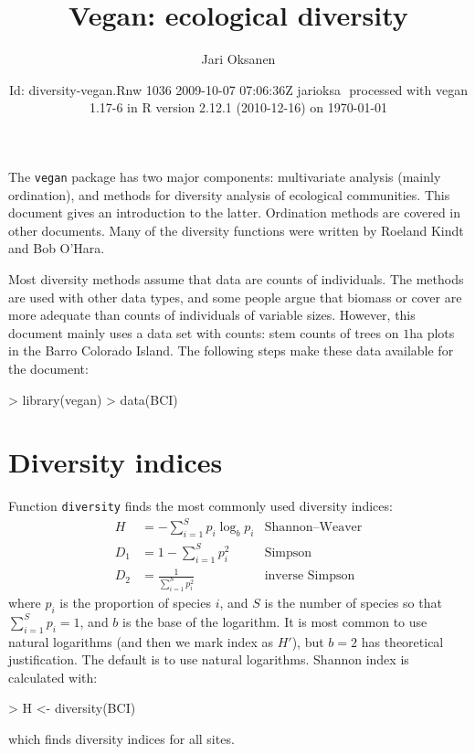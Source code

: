 \documentclass[a4paper,10pt]{amsart}
\title{Vegan: ecological diversity}
\author{Jari Oksanen}
\date{$ $Id: diversity-vegan.Rnw 1036 2009-10-07 07:06:36Z jarioksa $ $
  processed with vegan 1.17-6
  in R version 2.12.1 (2010-12-16) on \today}
\begin{document}

\maketitle

\tableofcontents

\noindent The \texttt{vegan} package has two major components:
multivariate analysis (mainly ordination), and methods for diversity
analysis of ecological communities.  This document gives an
introduction to the latter.  Ordination methods are covered in other
documents.  Many of the diversity functions were written by Roeland
Kindt and Bob O'Hara.

Most diversity methods assume that data are counts of individuals.
The methods are used with other data types, and some people argue that
biomass or cover are more adequate than counts of individuals of
variable sizes.  However, this document mainly uses a data set with
counts: stem counts of trees on $1$ha plots in the Barro Colorado
Island.  The following steps make these data available for the
document:
\begin{Schunk}
\begin{Sinput}
> library(vegan)
> data(BCI)
\end{Sinput}
\end{Schunk}

\section{Diversity indices}

Function \texttt{diversity} finds the most commonly used diversity
indices:
\begin{align}
H &= - \sum_{i=1}^S p_i \log_b  p_i & \text{Shannon--Weaver}\\
D_1 &= 1 - \sum_{i=1}^S p_i^2  &\text{Simpson}\\
D_2 &= \frac{1}{\sum_{i=1}^S p_i^2}  &\text{inverse Simpson}
\end{align}
where $p_i$ is the proportion of species $i$, and $S$ is the number of
species so that $\sum_{i=1}^S p_i = 1$, and $b$ is the base of the
logarithm.  It is most common to use natural logarithms (and then we
mark index as $H'$), but $b=2$ has
theoretical justification. The default is to use natural logarithms.
Shannon index is calculated with:
\begin{Schunk}
\begin{Sinput}
> H <- diversity(BCI)
\end{Sinput}
\end{Schunk}
which finds diversity indices for all sites.
\end{document}
